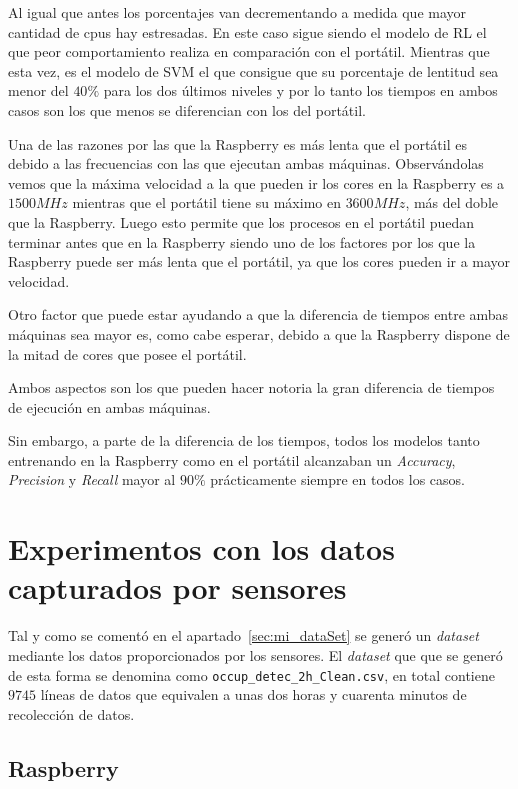 \documentclass[a4paper, 12pt]{book}
\begin{document}
Al igual que antes los porcentajes van decrementando a medida que mayor cantidad de cpus hay estresadas. En este caso sigue siendo el modelo de RL el que peor comportamiento realiza en comparación con el portátil. Mientras que esta vez, es el modelo de SVM el que consigue que su porcentaje de lentitud sea menor del $40\%$ para los dos últimos niveles y por lo tanto los tiempos en ambos casos son los que menos se diferencian con los del portátil.

Una de las razones por las que la Raspberry es más lenta que el portátil es debido a las frecuencias con las que ejecutan ambas máquinas. Observándolas vemos que la máxima velocidad a la que pueden ir los cores en la Raspberry es a $1500MHz$ mientras que el portátil tiene su máximo en $3600MHz$, más del doble que la Raspberry. Luego esto permite que los procesos en el portátil puedan terminar antes que en la Raspberry siendo uno de los factores por los que la Raspberry puede ser más lenta que el portátil, ya que los cores pueden ir a mayor velocidad.

Otro factor que puede estar ayudando a que la diferencia de tiempos entre ambas máquinas sea mayor es, como cabe esperar, debido a que la Raspberry dispone de la mitad de cores que posee el portátil.

Ambos aspectos son los que pueden hacer notoria la gran diferencia de tiempos de ejecución en ambas máquinas.

Sin embargo, a parte de la diferencia de los tiempos, todos los modelos tanto entrenando en la Raspberry como en el portátil alcanzaban un \textit{Accuracy}, \textit{Precision} y \textit{Recall} mayor al $90\%$ prácticamente siempre en todos los casos.

\section{Experimentos con los datos capturados por sensores}
\label{sec:exp_dSensados}

Tal y como se comentó en el apartado~\ref{sec:mi_dataSet} se generó un \textit{dataset} mediante los datos proporcionados por los sensores. El \textit{dataset} que que se generó de esta forma se denomina como \texttt{occup\_detec\_2h\_Clean.csv}, en total contiene $9745$ líneas de datos que equivalen a unas dos horas y cuarenta minutos de recolección de datos.

\subsection{Raspberry}
\label{subsec:rasp_sensados}
\end{document}
